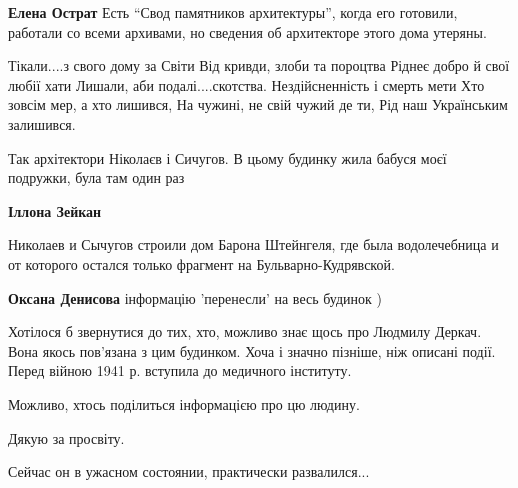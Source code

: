 \begin{itemize}
\begin{itemize} %
\textbf{Елена Острат} Есть \enquote{Свод памятников архитектуры}, когда его готовили, работали со всеми архивами, но сведения об архитекторе этого дома утеряны.
\end{itemize} %


\obeycr
Тікали....з свого дому за Світи
Від кривди, злоби та пороцтва
Ріднеє добро й свої любії хати
Лишали, аби подалі....скотства.
Нездійсненність і смерть мети
Хто зовсім мер, а хто лишився,
На чужині, не свій чужий де ти,
Рід наш Українським залишився.
\restorecr


Так архітектори Ніколаєв і Сичугов. В цьому будинку жила бабуся моєї подружки, була там один раз

\begin{itemize} %
\textbf{Іллона Зейкан} 

Николаев и Сычугов строили дом Барона Штейнгеля, где была водолечебница и от
которого остался только фрагмент на Бульварно-Кудрявской.

\textbf{Оксана Денисова} інформацію 'перенесли' на весь будинок )
\end{itemize} %


Хотілося б звернутися до тих, хто, можливо знає щось про Людмилу Деркач. Вона
якось пов'язана з цим будинком. Хоча і значно пізніше, ніж описані події. Перед
війною 1941 р. вступила до медичного інституту.

Можливо, хтось поділиться інформацією про цю людину.

Дякую за просвіту.

Сейчас он в ужасном состоянии, практически развалился...

\end{itemize} %
